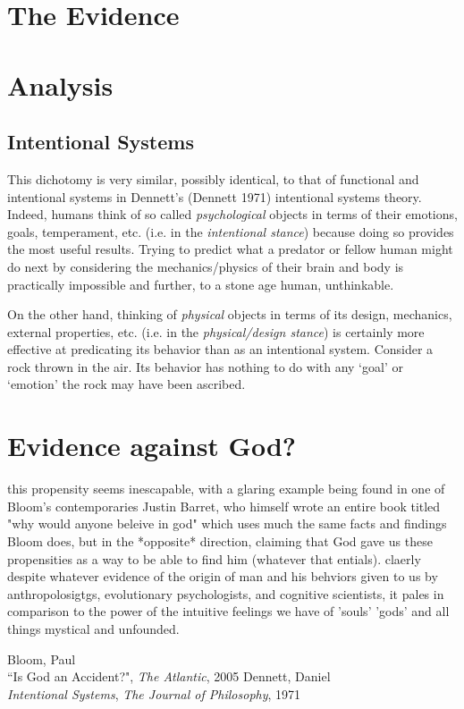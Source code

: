 \documentclass{article}
\begin{document}
\section{The Evidence}


\section{Analysis}

\subsection{Intentional Systems}
This dichotomy is very similar, possibly identical, to that of functional and intentional systems in Dennett's (Dennett 1971) intentional systems theory. Indeed, humans think of so called \emph{psychological} objects in terms of their emotions, goals, temperament, etc. (i.e. in the \emph{intentional stance}) because doing so provides the most useful results. Trying to predict what a predator or fellow human might do next by considering the mechanics/physics of their brain and body is practically impossible and further, to a stone age human, unthinkable.

On the other hand, thinking of \emph{physical} objects in terms of its design, mechanics, external properties, etc. (i.e. in the \emph{physical/design stance}) is certainly more effective at predicating its behavior than as an intentional system. Consider a rock thrown in the air. Its behavior has nothing to do with any `goal' or `emotion' the rock may have been ascribed.

\section{Evidence against God?}
this propensity seems inescapable, with a glaring example being found in one of Bloom's contemporaries Justin Barret, who himself wrote an entire book titled "why would anyone beleive in god" which uses much the same facts and findings Bloom does, but in the *opposite* direction, claiming that God gave us these propensities as a way to be able to find him (whatever that entials). claerly despite whatever evidence of the origin of man and his behviors given to us by anthropolosigtgs, evolutionary psychologists, and cognitive scientists, it pales in comparison to the power of the intuitive feelings we have of 'souls' 'gods' and all things mystical and unfounded.


\begin{thebibliography}{999}
  Bloom, Paul\\
  ``Is God an Accident?", \emph{The Atlantic}, 2005
  Dennett, Daniel\\
  \emph{Intentional Systems}, \emph{The Journal of Philosophy}, 1971
\end{thebibliography}
\end{document}
